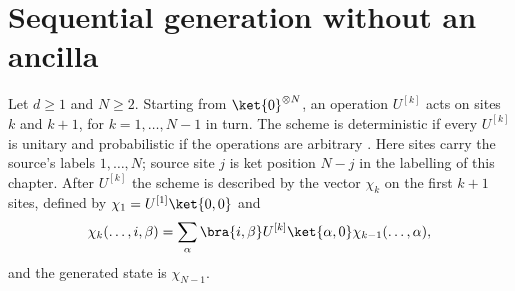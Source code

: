 \section{Sequential generation without an ancilla}

\begin{definition}
    \label{def:seqanc_no_ancilla}
    \leanok
    Let $d\ge 1$ and $N\ge 2$. Starting from $\ket{0}^{\otimes N}$, an operation $U^{[k]}$
    acts on sites $k$ and $k+1$, for $k=1,\dots,N-1$ in turn. The scheme is
    deterministic if every $U^{[k]}$ is unitary and probabilistic if the
    operations are arbitrary \cite[Section~5.2]{PerezGarcia2007Matrix}. Here
    sites carry the source's labels $1,\dots,N$; source site $j$ is ket
    position $N-j$ in the labelling of this chapter. After
    $U^{[k]}$ the scheme is described by the vector $\chi_k$ on the first
    $k+1$ sites, defined by $\chi_1=U^{[1]}\ket{0,0}$ and
    \begin{align*}
        \chi_k(\dots,i,\beta)=\sum_\alpha\bra{i,\beta}U^{[k]}\ket{\alpha,0}
        \chi_{k-1}(\dots,\alpha),
    \end{align*}
    and the generated state is $\chi_{N-1}$.
\end{definition}

